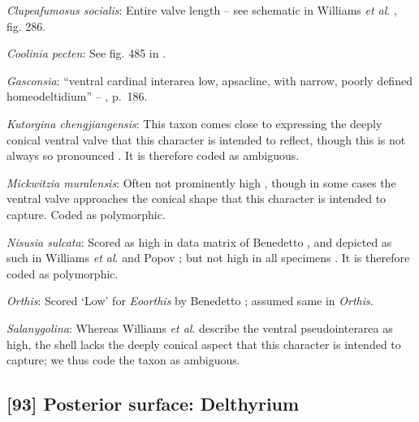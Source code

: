 \documentclass[openany]{book}
\theoremstyle{definition}
\theoremstyle{definition}
\theoremstyle{definition}
\theoremstyle{remark}
\begin{document}
\hypertarget{Clupeafumosus_socialis-coding-92}{}
\emph{Clupeafumosus socialis}: Entire valve length -- see schematic in
Williams \emph{et al}. \citeyearpar{Williams1997Introduction}, fig. 286.

\hypertarget{Coolinia_pecten-coding-92}{}
\emph{Coolinia pecten}: See fig. 485 in
\citet{Williams2000LinguliformeaCraniiformea}.

\hypertarget{Gasconsia-coding-92}{}
\emph{Gasconsia}: ``ventral cardinal interarea low, apsacline, with
narrow, poorly defined homeodeltidium'' --
\citet{Williams2000LinguliformeaCraniiformea}, p.~186.

\hypertarget{Kutorgina_chengjiangensis-coding-92}{}
\emph{Kutorgina chengjiangensis}: This taxon
\citetext{\citealp[see][fig.
129]{Williams2000LinguliformeaCraniiformea}; \citealp[fig.
1]{Popov1992TheCambrian}} comes close to expressing the deeply conical
ventral valve that this character is intended to reflect, though this is
not always so pronounced \citep[e.g.][fig.
125]{Williams2000LinguliformeaCraniiformea}. It is therefore coded as
ambiguous.

\hypertarget{Mickwitzia_muralensis-coding-92}{}
\emph{Mickwitzia muralensis}: Often not prominently high
\citep{Skovsted2003EarlyCambrian, Balthasar2004Shellstructure}, though
in some cases \citep[e.g.][]{Butler2015Exceptionallypreserved} the
ventral valve approaches the conical shape that this character is
intended to capture. Coded as polymorphic.

\hypertarget{Nisusia_sulcata-coding-92}{}
\emph{Nisusia sulcata}: Scored as high in data matrix of Benedetto
\citeyearpar{Benedetto2009iChaniella}, and depicted as such in Williams
\emph{et al}. \citeyearpar[fig.
125]{Williams2000LinguliformeaCraniiformea} and Popov \citeyearpar[fig.
1]{Popov1992TheCambrian}; but not high in all specimens
\citep[e.g.][fig. 126]{Williams2000LinguliformeaCraniiformea}. It is
therefore coded as polymorphic.

\hypertarget{Orthis-coding-92}{}
\emph{Orthis}: Scored `Low' for \emph{Eoorthis} by Benedetto
\citeyearpar{Benedetto2009iChaniella}; assumed same in \emph{Orthis}.

\hypertarget{Salanygolina-coding-92}{}
\emph{Salanygolina}: Whereas Williams \emph{et al}.
\citeyearpar[p.~156]{Williams2000LinguliformeaCraniiformea} describe the
ventral pseudointerarea as high, the shell lacks the deeply conical
aspect that this character is intended to capture; we thus code the
taxon as ambiguous.

\subsection*{{[}93{]} Posterior surface:
Delthyrium}\label{posterior-surface-delthyrium}
\end{document}
